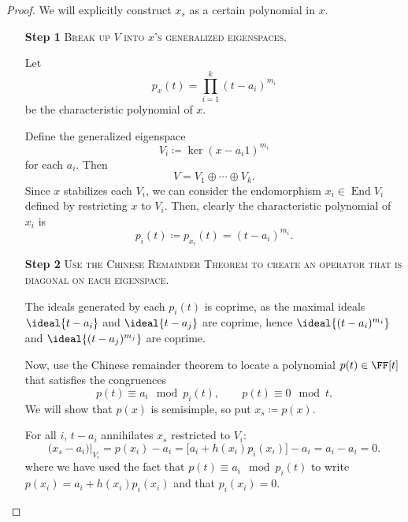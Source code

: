 \documentclass{article}
\DeclarePairedDelimiter\ideal\langle\rangle
\DeclareMathOperator{\End}{End}
\begin{document}
\begin{proof}
    We will explicitly construct $x_s$ as a certain polynomial in $x$.

    \begin{itemize}
        \item[\textbf{Step 1}] 
            \textsc{\color{Crimson} Break up $V$ into $x$'s generalized eigenspaces.}

            Let
            \[
                p_x(t)
                =
                \prod_{i=1}^k
                (t - a_i)^{m_i}
            \]
            be the characteristic polynomial of $x$.

            Define the generalized eigenspace
            \[
                V_i
                \coloneq
                \ker (x - a_i 1)^{m_i}
            \]
            for each $a_i$.
            Then
            \[
                V 
                =
                V_1 \oplus \cdots \oplus V_k.
            \]
            Since $x$ stabilizes each $V_i$, we can consider the endomorphism $x_i \in \End V_i$ defined by restricting $x$ to $V_i$.
            Then, clearly the characteristic polynomial of $x_i$ is
            \[
                p_i(t)
                \coloneq
                p_{x_i}(t)
                =
                (t-a_i)^{m_i}.
            \]
        \item[\textbf{Step 2}] 
            \textsc{\color{Crimson} Use the Chinese Remainder Theorem to create an operator that is diagonal on each eigenspace.}

            The ideals generated by each $p_i(t)$ is coprime, as
            the maximal ideals $\ideal{t-a_i}$ and $\ideal{t-a_j}$ are coprime, hence $\ideal{(t-a_i)^{m_i}}$ and $\ideal{(t-a_j)^{m_j}}$ are coprime.

            Now, use the Chinese remainder theorem to locate a polynomial $p(t) \in \FF[t]$ that satisfies the congruences
            \[
                p(t)
                \equiv
                a_i \mod p_i(t)
                ,\qquad
                p(t)
                \equiv
                0 \mod t.
            \]
            We will show that $p(x)$ is semisimple, so put $x_s \coloneq p(x)$.

            For all $i$, $t - a_i$ annihilates $x_s$ restricted to $V_i$:
            \[
                \big(x_s - a_i\big)\big\rvert_{V_i}
                =
                p(x_i) - a_i
                =
                \big[a_i + h(x_i)p_i(x_i)\big] - a_i
                =
                a_i - a_i
                =
                0.
            \]
            where we have used the fact that $p(t) \equiv a_i \mod p_i(t)$ to write $p(x_i) = a_i + h(x_i)p_i(x_i)$ and that $p_i(x_i) = 0$.

    \end{itemize}

\end{proof}
\end{document}
